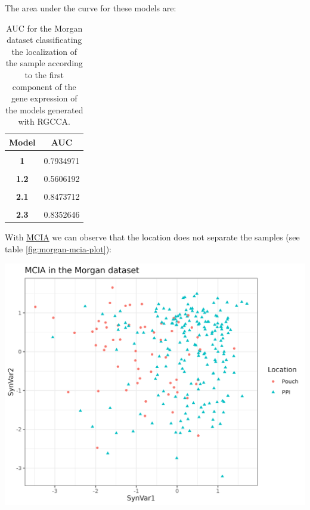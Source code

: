 \documentclass[
  12pt,
  a4paper,
  twoside,
  openright]{book}
\let\origfigure\figure
\let\endorigfigure\endfigure
\renewenvironment{figure}[1][2] {
    \expandafter\origfigure\expandafter[!htbp]
} {
    \endorigfigure
}
\begin{document}
The area under the curve for these models are:

\begin{table}[H]

\caption[AUC for the Morgan dataset]{\label{tab:morgan-auc}AUC for the Morgan dataset classificating the localization of the sample according to the first component of the gene expression of the models generated with RGCCA.}
\centering
\begin{tabular}[t]{>{}c|c}
\hline
\textbf{Model} & \textbf{AUC}\\
\hline
\textbf{\cellcolor{gray!6}{0}} & \cellcolor{gray!6}{0.4969734}\\
\hline
\textbf{1} & 0.7934971\\
\hline
\textbf{\cellcolor{gray!6}{1.1}} & \cellcolor{gray!6}{0.8161536}\\
\hline
\textbf{1.2} & 0.5606192\\
\hline
\textbf{\cellcolor{gray!6}{2}} & \cellcolor{gray!6}{0.8546351}\\
\hline
\textbf{2.1} & 0.8473712\\
\hline
\textbf{\cellcolor{gray!6}{2.2}} & \cellcolor{gray!6}{0.8352646}\\
\hline
\textbf{2.3} & 0.8352646\\
\hline
\end{tabular}
\end{table}

With \protect\hyperlink{acronyms_MCIA}{MCIA} we can observe that the location does not separate the samples (see table \ref{fig:morgan-mcia-plot}):

\begin{figure}
\includegraphics[width=1\linewidth]{images/morgan-mcia} \caption[MCIA dimensions in the Morgan dataset.]{MCIA dimensions in the Morgan dataset. MCIA first two dimensions of the dataset shows some separation between samples by location. Each point represents a sample (colored and shaped by location).}\label{fig:morgan-mcia-plot}
\end{figure}
\end{document}
